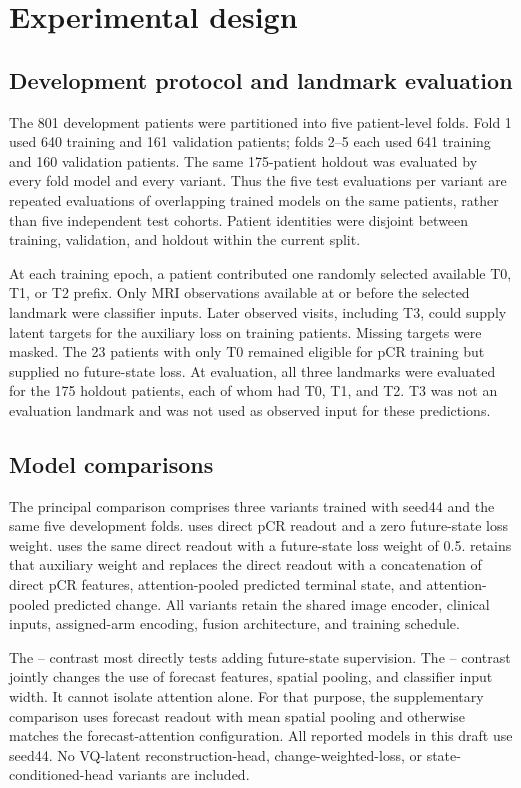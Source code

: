 \section{Experimental design}
\label{sec:experiments}
\subsection{Development protocol and landmark evaluation}
The 801 development patients were partitioned into five patient-level folds. Fold 1 used 640 training and 161 validation patients; folds 2--5 each used 641 training and 160 validation patients. The same 175-patient holdout was evaluated by every fold model and every variant. Thus the five test evaluations per variant are repeated evaluations of overlapping trained models on the same patients, rather than five independent test cohorts. Patient identities were disjoint between training, validation, and holdout within the current split.

At each training epoch, a patient contributed one randomly selected available T0, T1, or T2 prefix. Only MRI observations available at or before the selected landmark were classifier inputs. Later observed visits, including T3, could supply latent targets for the auxiliary loss on training patients. Missing targets were masked. The 23 patients with only T0 remained eligible for pCR training but supplied no future-state loss. At evaluation, all three landmarks were evaluated for the 175 holdout patients, each of whom had T0, T1, and T2. T3 was not an evaluation landmark and was not used as observed input for these predictions.

\subsection{Model comparisons}
The principal comparison comprises three variants trained with seed44 and the same five development folds. \nojepa{} uses direct pCR readout and a zero future-state loss weight. \direct{} uses the same direct readout with a future-state loss weight of 0.5. \fullmodel{} retains that auxiliary weight and replaces the direct readout with a concatenation of direct pCR features, attention-pooled predicted terminal state, and attention-pooled predicted change. All variants retain the shared image encoder, clinical inputs, assigned-arm encoding, fusion architecture, and training schedule.

The \direct{}--\nojepa{} contrast most directly tests adding future-state supervision. The \fullmodel{}--\direct{} contrast jointly changes the use of forecast features, spatial pooling, and classifier input width. It cannot isolate attention alone. For that purpose, the supplementary \meanmodel{} comparison uses forecast readout with mean spatial pooling and otherwise matches the forecast-attention configuration. All reported models in this draft use seed44. No VQ-latent reconstruction-head, change-weighted-loss, or state-conditioned-head variants are included.

